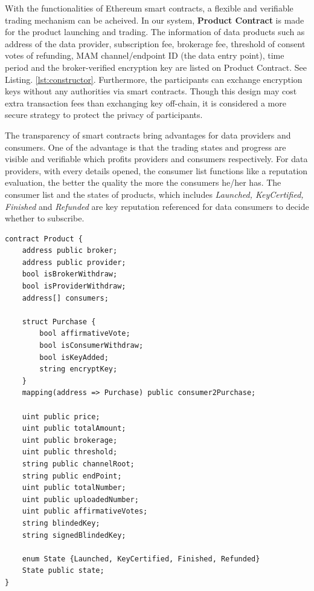 \documentclass[conference]{IEEEtran}
\begin{document}
With the functionalities of Ethereum smart contracts, a flexible and verifiable trading mechanism can be acheived. In our system, \textbf{Product Contract} is made for the product launching and trading. The information of data products such as address of the data provider, subscription fee, brokerage fee, threshold of consent votes of refunding, MAM channel/endpoint ID (the data entry point), time period and the broker-verified encryption key are listed on Product Contract. See Listing. \ref{lst:constructor}. Furthermore, the participants can exchange encryption keys without any authorities via smart contracts. Though this design may cost extra transaction fees than exchanging key off-chain, it is considered a more secure strategy to protect the privacy of participants.

The transparency of smart contracts bring advantages for data providers and consumers. One of the advantage is that the trading states and progress are visible and verifiable which profits providers and consumers respectively. For data providers, with every details opened, the consumer list functions like a reputation evaluation, the better the quality the more the consumers he/her has. The consumer list and the states of products, which includes \textit{Launched, KeyCertified, Finished} and \textit{Refunded} are key reputation referenced for data consumers to decide whether to subscribe. 

\lstset{style=solidity}
\begin{lstlisting}[caption={Product Contract data fields}, label={lst:constructor}, frame=single]
contract Product {
    address public broker;
    address public provider;
    bool isBrokerWithdraw;
    bool isProviderWithdraw;
    address[] consumers;
    
    struct Purchase {
        bool affirmativeVote;
        bool isConsumerWithdraw;
        bool isKeyAdded;
        string encryptKey;
    }
    mapping(address => Purchase) public consumer2Purchase;
    
    uint public price;
    uint public totalAmount;
    uint public brokerage;
    uint public threshold;
    string public channelRoot;
    string public endPoint;
    uint public totalNumber;
    uint public uploadedNumber;
    uint public affirmativeVotes;
    string blindedKey;
    string signedBlindedKey;
    
    enum State {Launched, KeyCertified, Finished, Refunded}
    State public state;
}
\end{lstlisting}
\end{document}

